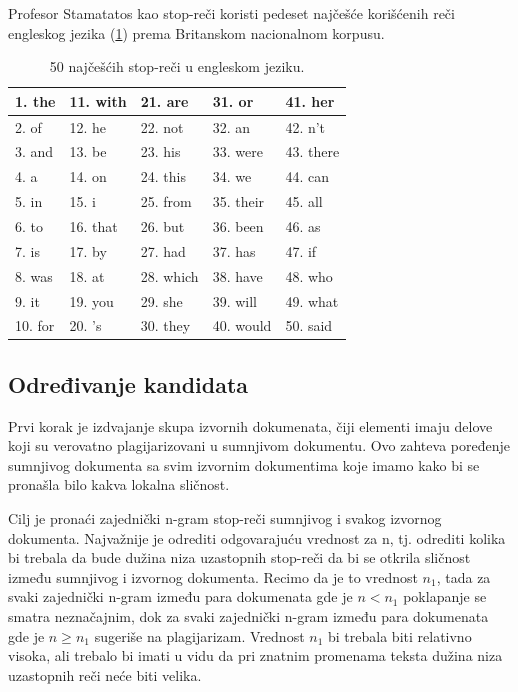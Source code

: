 \documentclass[a4paper]{article}
\begin{document}
\par Profesor Stamatatos kao stop-reči koristi pedeset najčešće korišćenih reči engleskog jezika (\ref{tab:tabela}) prema Britanskom nacionalnom korpusu. 

\begin{table}[h!]
\begin{center}
\caption{50 najčešćih stop-reči u engleskom jeziku.}
\begin{tabular}{|l|l|l|l|l|} \hline
1. the & 11. with & 21. are & 31. or & 41. her \\ \hline
2. of & 12. he & 22. not & 32. an & 42. n't \\ \hline
3. and & 13. be & 23. his & 33. were & 43. there \\ \hline
4. a & 14. on & 24. this & 34. we & 44. can \\ \hline
5. in & 15. i & 25. from & 35. their & 45. all \\ \hline
6. to & 16. that & 26. but & 36. been & 46. as \\ \hline
7. is & 17. by & 27. had & 37. has & 47. if \\ \hline
8. was & 18. at & 28. which & 38. have & 48. who \\ \hline
9. it & 19. you & 29. she & 39. will & 49. what \\ \hline
10. for & 20. 's & 30. they & 40. would & 50. said \\ \hline
\end{tabular}
\label{tab:tabela}
\end{center}
\end{table}

\subsection{Određivanje kandidata}
\label{subsec:odredjivanje kandidata}

Prvi korak je izdvajanje skupa izvornih dokumenata, čiji elementi imaju delove koji su verovatno 
plagijarizovani u sumnjivom dokumentu. Ovo zahteva poređenje sumnjivog dokumenta sa svim izvornim  dokumentima koje imamo kako bi se pronašla bilo kakva lokalna sličnost.

\par Cilj je pronaći zajednički n-gram stop-reči sumnjivog i svakog izvornog dokumenta. Najvažnije je odrediti odgovarajuću vrednost za n, tj. odrediti kolika bi trebala da bude dužina niza uzastopnih stop-reči da bi se otkrila sličnost između  sumnjivog i izvornog dokumenta. Recimo da je to vrednost \( n_{1} \), tada za svaki  zajednički n-gram između para dokumenata gde je \( n < n_{1} \)  poklapanje se smatra neznačajnim, dok za svaki zajednički n-gram između para dokumenata gde je \( n \geq n_{1} \) sugeriše na plagijarizam. Vrednost \( n_{1} \) bi trebala biti relativno visoka, ali trebalo bi imati u vidu da pri znatnim promenama teksta dužina niza uzastopnih reči neće biti velika. 
\end{document}

